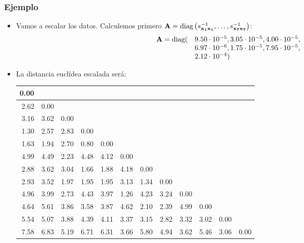 \begin{frame}
\frametitle{Ejemplo}
\begin{itemize}
\item<2->{Vamos a escalar los datos. Calculemos primero $\mathbf{A}= \mbox{diag} \left( s_{\mathbf{x_1}\mathbf{x_1}}^{-1},\ldots,s_{\mathbf{x_7}\mathbf{x_7}}^{-1}
\right)$:
$$
\begin{array}{ll}
\mathbf{A} = \mbox{diag} ( & 9.50\cdot 10^{-5}, 3.05\cdot 10^{-5}, 4.00\cdot 10^{-5}, \\  & 6.97\cdot 10^{-6}, 1.75\cdot 10^{-5},7.95\cdot 10^{-5},\\ &  2.12\cdot 10^{-4})
\end{array}$$}
\item<3->{La distancia euclídea escalada será:
\begin{center}
{\tiny
\begin{tabular}{|r@{}|r@{}|r@{}|r@{}|r@{}|r@{}|r@{}|r@{}|r@{}|r@{}|r@{}|r@{}|}\hline
0.00 &&&&&&&&&&&\\\hline                                                                                                                         
2.62&    0.00&&&&&&&&&&\\        \hline                                                                                                        
3.16&  3.62 &    0.00&&&&&&&&&\\\hline                                                                                                     
1.30 &  2.57 &  2.83 &    0.00&&&&&&&&\\        \hline                                                                                  
1.63& 1.94&  2.70&   0.80&    0.00&&&&&&&\\         \hline                                                                      
4.99&4.49&  2.23& 4.48& 4.12 &    0.00&&&&&&\\         \hline                                                           
2.88&  3.62&  3.04& 1.66&  1.88&  4.18 &   0.00&&&&&\\              \hline                                           
2.93 & 3.52& 1.97&  1.95&  1.95&  3.13&  1.34&    0.00&&&&\\     \hline                                         
4.96&3.99&  2.73& 4.43& 3.97&  1.26&  4.23&  3.24&    0.00&&&\\      \hline                             
4.64&  5.61&  3.86& 3.58&  3.87&  4.62&  2.10&  2.39&  4.99&    0.00&&\\      \hline                  
5.54&  5.07&  3.88& 4.39&  4.11& 3.37&  3.15&  2.82&  3.32&  3.02&    0.00&\\    \hline         
7.58&   6.83& 5.19& 6.71&  6.31& 3.66& 5.80&  4.94& 3.62&  5.46&  3.06 & 0.00 \\\hline  
\end{tabular}}
\end{center}}
\end{itemize}
\end{frame}
